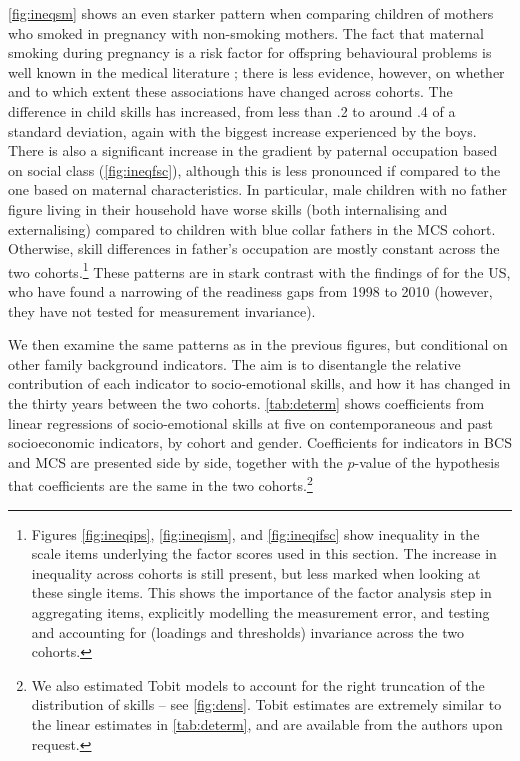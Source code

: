 \autoref{fig:ineqsm} shows an even starker pattern when comparing children of mothers who smoked in pregnancy with non-smoking mothers. The fact that maternal smoking during pregnancy is a risk factor for offspring behavioural problems is well known in the medical literature \citep{Gaysina2013}; there is less evidence, however, on whether and to which extent these associations have changed across cohorts. The difference in child skills has increased, from less than .2 to around .4 of a standard deviation, again with the biggest increase experienced by the boys. There is also a significant increase in the gradient by paternal occupation based on social class (\autoref{fig:ineqfsc}), although this is less pronounced if compared to the one based on maternal characteristics. In particular, male children with no father figure living in their household have worse skills (both internalising and externalising) compared to children with blue collar fathers in the MCS cohort. Otherwise, skill differences in father's occupation are mostly constant across the two cohorts.\footnote{Figures \ref{fig:ineqips}, \ref{fig:ineqism}, and \ref{fig:ineqifsc} show inequality in the scale items underlying the factor scores used in this section. The increase in inequality across cohorts is still present, but less marked when looking at these single items. This shows the importance of the factor analysis step in aggregating items, explicitly modelling the measurement error, and testing and accounting for (loadings and thresholds) invariance across the two cohorts.} These patterns are in stark contrast with the findings of \citet{Reardon2016} for the US, who have found a narrowing of the readiness gaps from 1998 to 2010 (however, they have not tested for measurement invariance).

We then examine the same patterns as in the previous figures, but conditional on other family background indicators. The aim is to disentangle the relative contribution of each indicator to socio-emotional skills, and how it has changed in the thirty years between the two cohorts. \autoref{tab:determ} shows coefficients from linear regressions of socio-emotional skills at five on contemporaneous and past socioeconomic indicators, by cohort and gender. Coefficients for indicators in BCS and MCS are presented side by side, together with the $p$-value of the hypothesis that coefficients are the same in the two cohorts.\footnote{We also estimated Tobit models to account for the right truncation of the distribution of skills -- see \autoref{fig:dens}. Tobit estimates are extremely similar to the linear estimates in \autoref{tab:determ}, and are available from the authors upon request.}

